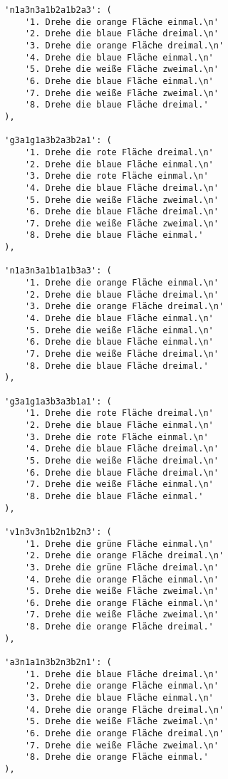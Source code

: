 \begin{lstlisting}
        'n1a3n3a1b2a1b2a3': (
            '1. Drehe die orange Fläche einmal.\n'
            '2. Drehe die blaue Fläche dreimal.\n'
            '3. Drehe die orange Fläche dreimal.\n'
            '4. Drehe die blaue Fläche einmal.\n'
            '5. Drehe die weiße Fläche zweimal.\n'
            '6. Drehe die blaue Fläche einmal.\n'
            '7. Drehe die weiße Fläche zweimal.\n'
            '8. Drehe die blaue Fläche dreimal.'
        ),

        'g3a1g1a3b2a3b2a1': (
            '1. Drehe die rote Fläche dreimal.\n'
            '2. Drehe die blaue Fläche einmal.\n'
            '3. Drehe die rote Fläche einmal.\n'
            '4. Drehe die blaue Fläche dreimal.\n'
            '5. Drehe die weiße Fläche zweimal.\n'
            '6. Drehe die blaue Fläche dreimal.\n'
            '7. Drehe die weiße Fläche zweimal.\n'
            '8. Drehe die blaue Fläche einmal.'
        ),

        'n1a3n3a1b1a1b3a3': (
            '1. Drehe die orange Fläche einmal.\n'
            '2. Drehe die blaue Fläche dreimal.\n'
            '3. Drehe die orange Fläche dreimal.\n'
            '4. Drehe die blaue Fläche einmal.\n'
            '5. Drehe die weiße Fläche einmal.\n'
            '6. Drehe die blaue Fläche einmal.\n'
            '7. Drehe die weiße Fläche dreimal.\n'
            '8. Drehe die blaue Fläche dreimal.'
        ),

        'g3a1g1a3b3a3b1a1': (
            '1. Drehe die rote Fläche dreimal.\n'
            '2. Drehe die blaue Fläche einmal.\n'
            '3. Drehe die rote Fläche einmal.\n'
            '4. Drehe die blaue Fläche dreimal.\n'
            '5. Drehe die weiße Fläche dreimal.\n'
            '6. Drehe die blaue Fläche dreimal.\n'
            '7. Drehe die weiße Fläche einmal.\n'
            '8. Drehe die blaue Fläche einmal.'
        ),

        'v1n3v3n1b2n1b2n3': (
            '1. Drehe die grüne Fläche einmal.\n'
            '2. Drehe die orange Fläche dreimal.\n'
            '3. Drehe die grüne Fläche dreimal.\n'
            '4. Drehe die orange Fläche einmal.\n'
            '5. Drehe die weiße Fläche zweimal.\n'
            '6. Drehe die orange Fläche einmal.\n'
            '7. Drehe die weiße Fläche zweimal.\n'
            '8. Drehe die orange Fläche dreimal.'
        ),

        'a3n1a1n3b2n3b2n1': (
            '1. Drehe die blaue Fläche dreimal.\n'
            '2. Drehe die orange Fläche einmal.\n'
            '3. Drehe die blaue Fläche einmal.\n'
            '4. Drehe die orange Fläche dreimal.\n'
            '5. Drehe die weiße Fläche zweimal.\n'
            '6. Drehe die orange Fläche dreimal.\n'
            '7. Drehe die weiße Fläche zweimal.\n'
            '8. Drehe die orange Fläche einmal.'
        ),


\end{lstlisting}
